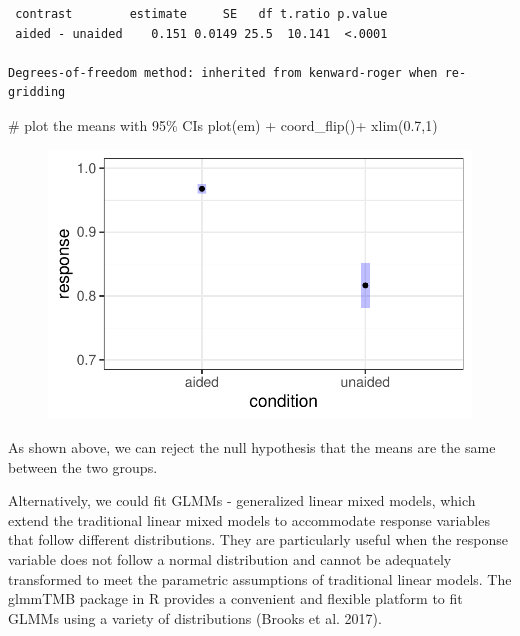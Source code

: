\documentclass[
  letterpaper,
  DIV=11,
  numbers=noendperiod]{scrreprt}
\newenvironment{Shaded}{\begin{snugshade}}{\end{snugshade}}
\newcommand{\CommentTok}[1]{\textcolor[rgb]{0.37,0.37,0.37}{#1}}
\newcommand{\DecValTok}[1]{\textcolor[rgb]{0.68,0.00,0.00}{#1}}
\newcommand{\FloatTok}[1]{\textcolor[rgb]{0.68,0.00,0.00}{#1}}
\newcommand{\FunctionTok}[1]{\textcolor[rgb]{0.28,0.35,0.67}{#1}}
\newcommand{\NormalTok}[1]{\textcolor[rgb]{0.00,0.23,0.31}{#1}}
\newcommand{\SpecialCharTok}[1]{\textcolor[rgb]{0.37,0.37,0.37}{#1}}
\begin{document}
\begin{verbatim}
 contrast        estimate     SE   df t.ratio p.value
 aided - unaided    0.151 0.0149 25.5  10.141  <.0001

Degrees-of-freedom method: inherited from kenward-roger when re-gridding 
\end{verbatim}

\begin{Shaded}
\begin{Highlighting}[]
\CommentTok{\# plot the means with 95\% CIs}
\FunctionTok{plot}\NormalTok{(em) }\SpecialCharTok{+}
  \FunctionTok{coord\_flip}\NormalTok{()}\SpecialCharTok{+}
  \FunctionTok{xlim}\NormalTok{(}\FloatTok{0.7}\NormalTok{,}\DecValTok{1}\NormalTok{)}
\end{Highlighting}
\end{Shaded}

\begin{figure}[H]

{\centering \includegraphics{data-sads_files/figure-pdf/unnamed-chunk-10-1.pdf}

}

\end{figure}

As shown above, we can reject the null hypothesis that the means are the
same between the two groups.

Alternatively, we could fit GLMMs - generalized linear mixed models,
which extend the traditional linear mixed models to accommodate response
variables that follow different distributions. They are particularly
useful when the response variable does not follow a normal distribution
and cannot be adequately transformed to meet the parametric assumptions
of traditional linear models. The glmmTMB package in R provides a
convenient and flexible platform to fit GLMMs using a variety of
distributions (Brooks et al. 2017).
\end{document}
